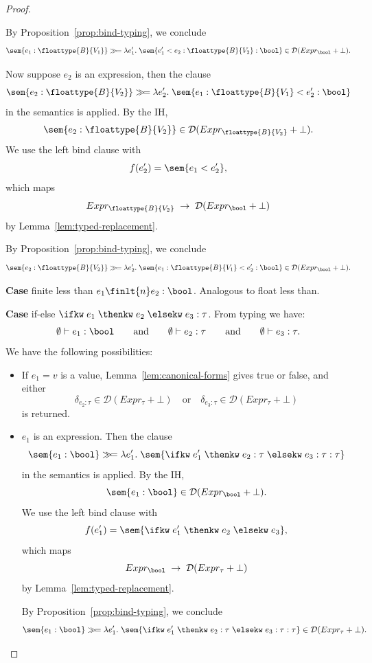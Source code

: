 \begin{proof}
\begin{itemize}
		By Proposition~\ref{prop:bind-typing}, we conclude
		\[
			\sem{e_1 : \floattype{B}{V_1}} \gg\!= \lambda e_1'.\;
			\sem{e_1' < e_2 : \floattype{B}{V_2} : \bool} \in \mathcal{D}(Expr_{\bool} + \bot).
		\]

		Now suppose $e_2$ is an expression, then the clause
		\[
			\sem{e_2 : \floattype{B}{V_2}} \gg\!= \lambda e_2'.\;
			\sem{e_1 : \floattype{B}{V_1} < e_2' : \bool}
		\]
		in the semantics is applied. By the IH,
		\[
			\sem{e_2 : \floattype{B}{V_2}} \in \mathcal{D}(Expr_{\floattype{B}{V_2}} + \bot).
		\]
		We use the left bind clause with 
		\[
			f(e_2') = \sem{e_1 < e_2'},
		\]
		which maps
		\[
			Expr_{\floattype{B}{V_2}} \;\to\; \mathcal{D}(Expr_{\bool} + \bot)
		\]
		by Lemma~\ref{lem:typed-replacement}. 

		By Proposition~\ref{prop:bind-typing}, we conclude
		\[
			\sem{e_2 : \floattype{B}{V_2}} \gg\!= \lambda e_2'.\;
			\sem{e_1 : \floattype{B}{V_1} < e_2' : \bool} \in \mathcal{D}(Expr_{\bool} + \bot).
		\]
		\end{itemize}

		\textbf{Case} finite less than $e_1 \finlt{n} e_2 : \bool$. Analogous to float less than.

		\textbf{Case} if-else $\ifkw \; e_1 \; \thenkw \; e_2 \; \elsekw \; e_3 : \tau$. From typing we have:
		\[
		\emptyset \vdash e_1 : \bool 
		\qquad\text{and}\qquad 
		\emptyset \vdash e_2 : \tau
		\qquad\text{and}\qquad 
		\emptyset \vdash e_3 : \tau.
		\]
		We have the following possibilities:
		\begin{itemize}
			\item If $e_1 = v$ is a value, Lemma~\ref{lem:canonical-forms} gives true or false, and either
			\[
				\delta_{e_2:\tau} \in \mathcal{D}(Expr_{\tau} + \bot) 
				\quad\text{or}\quad
				\delta_{e_3:\tau} \in \mathcal{D}(Expr_{\tau} + \bot)
			\]
			is returned.

			\item $e_1$ is an expression. Then the clause
			\[
				\sem{e_1 : \bool} \gg\!= \lambda e_1'.\;
				\sem{\ifkw \; e_1' \; \thenkw \; e_2 : \tau \; \elsekw \; e_3 : \tau : \tau}
			\]
			in the semantics is applied. By the IH,
			\[
				\sem{e_1 : \bool} \in \mathcal{D}(Expr_{\bool} + \bot).
			\]
			We use the left bind clause with 
			\[
				f(e_1') = \sem{\ifkw \; e_1' \; \thenkw \; e_2 \; \elsekw \; e_3},
			\]
			which maps
			\[
				Expr_{\bool} \;\to\; \mathcal{D}(Expr_{\tau} + \bot)
			\]
			by Lemma~\ref{lem:typed-replacement}.

			By Proposition~\ref{prop:bind-typing}, we conclude
			\[
				\sem{e_1 : \bool} \gg\!= \lambda e_1'.\;
				\sem{\ifkw \; e_1' \; \thenkw \; e_2 : \tau \; \elsekw \; e_3 : \tau : \tau} \in \mathcal{D}(Expr_{\tau} + \bot).
			\]
		\end{itemize}


\end{proof}

